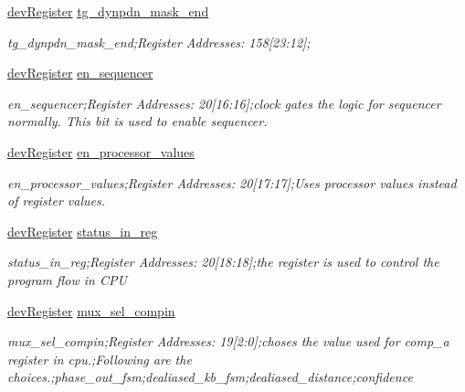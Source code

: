 \begin{DoxyCompactItemize}
\mbox{\hyperlink{classdev_register}{dev\+Register}} \mbox{\hyperlink{class_o_p_t3101_registers_abb219a99926fa9a5beaaa2419b559274}{tg\+\_\+dynpdn\+\_\+mask\+\_\+end}}
\begin{DoxyCompactList}\small\item\em tg\+\_\+dynpdn\+\_\+mask\+\_\+end;Register Addresses\+: 158\mbox{[}23\+:12\mbox{]}; \end{DoxyCompactList}\item 
\mbox{\hyperlink{classdev_register}{dev\+Register}} \mbox{\hyperlink{class_o_p_t3101_registers_a627b97139ec13e02334d4183cacb35f8}{en\+\_\+sequencer}}
\begin{DoxyCompactList}\small\item\em en\+\_\+sequencer;Register Addresses\+: 20\mbox{[}16\+:16\mbox{]};clock gates the logic for sequencer normally. This bit is used to enable sequencer. \end{DoxyCompactList}\item 
\mbox{\hyperlink{classdev_register}{dev\+Register}} \mbox{\hyperlink{class_o_p_t3101_registers_ac4898e42b8cad4381667be1ac1aef1db}{en\+\_\+processor\+\_\+values}}
\begin{DoxyCompactList}\small\item\em en\+\_\+processor\+\_\+values;Register Addresses\+: 20\mbox{[}17\+:17\mbox{]};Uses processor values instead of register values. \end{DoxyCompactList}\item 
\mbox{\hyperlink{classdev_register}{dev\+Register}} \mbox{\hyperlink{class_o_p_t3101_registers_a32ff105833ca130e9aafdc69d33b14eb}{status\+\_\+in\+\_\+reg}}
\begin{DoxyCompactList}\small\item\em status\+\_\+in\+\_\+reg;Register Addresses\+: 20\mbox{[}18\+:18\mbox{]};the register is used to control the program flow in C\+PU \end{DoxyCompactList}\item 
\mbox{\hyperlink{classdev_register}{dev\+Register}} \mbox{\hyperlink{class_o_p_t3101_registers_ab7fb1c397a31af95e2d2248d03bef80e}{mux\+\_\+sel\+\_\+compin}}
\begin{DoxyCompactList}\small\item\em mux\+\_\+sel\+\_\+compin;Register Addresses\+: 19\mbox{[}2\+:0\mbox{]};choses the value used for comp\+\_\+a register in cpu.;Following are the choices.;phase\+\_\+out\+\_\+fsm;dealiased\+\_\+kb\+\_\+fsm;dealiased\+\_\+distance;confidence \end{DoxyCompactList}\item 

\end{DoxyCompactItemize}
